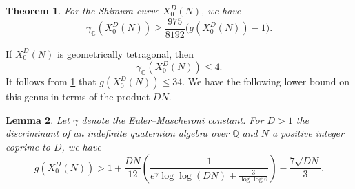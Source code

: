 \documentclass[11pt,reqno]{amsart}
\newcommand{\Q}{\mathbb{Q}}
\newcommand{\C}{\mathbb{C}}
\newtheorem{theorem}{Theorem}[section]
\newtheorem{lemma}[theorem]{Lemma}
\theoremstyle{definition}
\begin{document}
\begin{theorem}{\cite[Theorem~1.1]{Abramovich96}}\label{theorem: Abr}
For the Shimura curve $X_0^D(N)$, we have
\[
\gamma_{\C}(X_0^D(N)) \ge \frac{975}{8192}\big(g(X_0^D(N))-1\big). 
\]
\end{theorem}

If $X_0^D(N)$ is geometrically tetragonal, then 
\[
\gamma_\C(X_0^D(N)) \leq 4.
\]
It follows from \cref{theorem: Abr} that $g(X_0^D(N)) \leq 34$. We have the following lower bound on this genus in terms of the product $DN$.

\begin{lemma}\cite[Lemma 10.6]{Saia24}\label{Lemma: Saia_genus_bound}
Let $\gamma$ denote the Euler--Mascheroni constant. For $D>1$ the discriminant of an indefinite quaternion algebra over $\Q$ and $N$ a positive integer coprime to $D$, we have
\[
g(X_0^D(N)) > 1 + \frac{DN}{12}\left( \frac{1}{e^\gamma \log\log(DN) + \frac{3}{\log\log{6}}} \right)- \frac{7\sqrt{DN}}{3}.
\]
\end{lemma}
\end{document}
